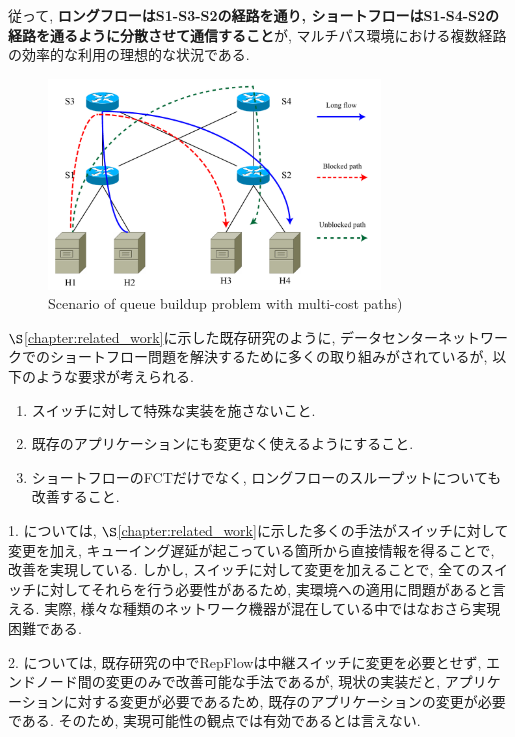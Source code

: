 従って, {\bf ロングフローはS1-S3-S2の経路を通り, ショートフローはS1-S4-S2の経路を通るように分散させて通信すること}が,
マルチパス環境における複数経路の効率的な利用の理想的な状況である. 

\begin{figure}[t]
    \begin{center}
    \includegraphics[autoebb, width=250pt]{./img/schenario.pdf}
    \caption{Scenario of queue buildup problem with multi-cost paths)}
    \label{fig:repflow_scenario}
    \end{center}
\end{figure}

$\S$\ref{chapter:related_work}に示した既存研究のように, 
データセンターネットワークでのショートフロー問題を解決するために多くの取り組みがされているが, 以下のような要求が考えられる. 
\begin{enumerate}
\item スイッチに対して特殊な実装を施さないこと. 
\item 既存のアプリケーションにも変更なく使えるようにすること. 
\item ショートフローのFCTだけでなく, ロングフローのスループットについても改善すること. 
\end{enumerate} 

1. については, $\S$\ref{chapter:related_work}に示した多くの手法がスイッチに対して変更を加え,
キューイング遅延が起こっている箇所から直接情報を得ることで, 改善を実現している. 
しかし, スイッチに対して変更を加えることで, 全てのスイッチに対してそれらを行う必要性があるため, 実環境への適用に問題があると言える. 
実際, 様々な種類のネットワーク機器が混在している中ではなおさら実現困難である\cite{d3}.

2. については, 既存研究の中でRepFlowは中継スイッチに変更を必要とせず, エンドノード間の変更のみで改善可能な手法であるが,
現状の実装だと, アプリケーションに対する変更が必要であるため, 既存のアプリケーションの変更が必要である\cite{repflow}.
そのため, 実現可能性の観点では有効であるとは言えない. 

